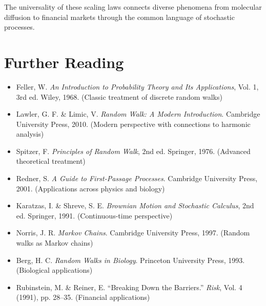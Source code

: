 \documentclass[a4paper, 11pt]{article}
\begin{document}
The universality of these scaling laws connects diverse phenomena from molecular diffusion to
financial markets through the common language of stochastic processes.

\section*{Further Reading}

\begin{itemize}
\item Feller, W. \textit{An Introduction to Probability Theory and Its Applications}, Vol. 1, 3rd ed.
Wiley, 1968. (Classic treatment of discrete random walks)

\item Lawler, G. F. \& Limic, V. \textit{Random Walk: A Modern Introduction}. Cambridge University
Press, 2010. (Modern perspective with connections to harmonic analysis)

\item Spitzer, F. \textit{Principles of Random Walk}, 2nd ed. Springer, 1976. (Advanced theoretical
treatment)

\item Redner, S. \textit{A Guide to First-Passage Processes}. Cambridge University Press, 2001.
(Applications across physics and biology)

\item Karatzas, I. \& Shreve, S. E. \textit{Brownian Motion and Stochastic Calculus}, 2nd ed.
Springer, 1991. (Continuous-time perspective)

\item Norris, J. R. \textit{Markov Chains}. Cambridge University Press, 1997. (Random walks as
Markov chains)

\item Berg, H. C. \textit{Random Walks in Biology}. Princeton University Press, 1993. (Biological
applications)

\item Rubinstein, M. \& Reiner, E. ``Breaking Down the Barriers.'' \textit{Risk}, Vol. 4 (1991),
pp. 28–35. (Financial applications)
\end{itemize}
\end{document}
